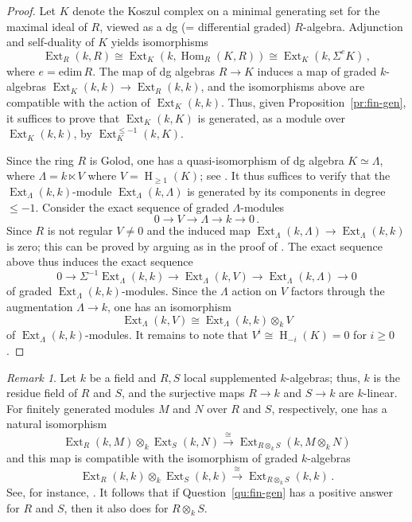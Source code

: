 \documentclass{amsart}
\numberwithin{equation}{section}
\theoremstyle{plain}
\theoremstyle{definition}
\theoremstyle{remark}
\newtheorem{remark}[equation]{Remark}
\newcommand{\ext}{\operatorname{Ext}}
\newcommand{\hh}{\operatorname{H}}
\newcommand{\Hom}{\operatorname{Hom}}
\begin{document}
\begin{proof}
Let $K$ denote the Koszul complex on a minimal generating set for the maximal ideal of $R$, viewed as a dg (= differential graded) $R$-algebra. Adjunction and self-duality of $K$ yields isomorphisms
\[
\ext_R(k,R) \cong \ext_K(k,\Hom_R(K,R)) \cong \ext_K(k,\Sigma^e K)\,,
\]
where $e=\mathrm{edim}\, R$. The map of dg algebras $R\to K$ induces a map of graded $k$-algebras $\ext_K(k,k)\to \ext_R(k,k)$, and the isomorphisms above are compatible with the action of $\ext_K(k,k)$. Thus, given Proposition~\ref{pr:fin-gen}, it suffices to prove that $\ext_K(k,K)$ is generated, as a module over $\ext_K(k,k)$, by $\ext^{\leqslant -1}_K(k,K)$. 

Since the ring $R$ is Golod, one has a quasi-isomorphism of dg algebra $K\simeq \Lambda$, where $\Lambda =k\ltimes V$ where $V=\hh_{\geqslant 1}(K)$; see \cite[Theorem~2.3]{Avramov:1986s}. It thus suffices to verify that the $\ext_{\Lambda}(k,k)$-module $\ext_{\Lambda}(k,\Lambda)$ is generated by its components in degree $\le -1$. Consider the exact sequence of graded $\Lambda$-modules
\[
0\longrightarrow V \longrightarrow \Lambda \longrightarrow k \longrightarrow 0\,.
\]
Since $R$ is not regular $V\ne 0$ and the induced map $\ext_{\Lambda}(k,\Lambda)\to \ext_{\Lambda}(k,k)$ is zero; this can be proved by arguing as in the proof of \cite[Theorem~2.4]{Avramov/Iyengar:2013s}. The exact sequence above thus induces the exact sequence 
\[
0\longrightarrow \Sigma^{-1} \ext_{\Lambda}(k,k) \longrightarrow  \ext_{\Lambda}(k,V) \longrightarrow  \ext_{\Lambda}(k,\Lambda)\longrightarrow 0
\]
of graded $\ext_{\Lambda}(k,k)$-modules. Since the $\Lambda$ action on $V$ factors through the augmentation $\Lambda\to k$, one has an isomorphism
\[
\ext_{\Lambda}(k,V) \cong \ext_{\Lambda}(k,k)\otimes_k V
\]
of $\ext_{\Lambda}(k,k)$-modules. It remains to note that $V^i\cong \hh_{-i}(K)=0$ for $i \ge 0$.
\end{proof}

\begin{remark}
    \label{re:tensor-product}
    Let $k$ be a field and $R,S$ local supplemented $k$-algebras; thus, $k$ is the residue field of $R$ and $S$, and the surjective maps $R\to k$ and $S\to k$ are $k$-linear. For finitely generated modules $M$ and $N$ over $R$ and $S$, respectively, one has a natural isomorphism
    \[
    \ext_R(k,M)\otimes_k \ext_S(k,N)\xrightarrow{\ \cong\ } \ext_{R\otimes_kS}(k,M\otimes_k N)
    \]
    and this map is compatible with the isomorphism of graded $k$-algebras
    \[
    \ext_R(k,k)\otimes_k \ext_S(k,k)\xrightarrow{\ \cong\ } \ext_{R\otimes_kS}(k,k)\,.
    \]
    See, for instance, \cite[Chapter XI, Theorem~3.1]{Cartan/Eilenberg:1956a}. It follows that if Question~\ref{qu:fin-gen} has a positive answer for $R$ and $S$, then it also does for $R\otimes_kS$.
\end{remark}
\end{document}
